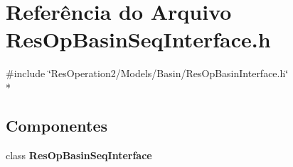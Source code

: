 \section{Referência do Arquivo Res\+Op\+Basin\+Seq\+Interface.\+h}
\label{_res_op_basin_seq_interface_8h}
{\ttfamily \#include \char`\"{}Res\+Operation2/\+Models/\+Basin/\+Res\+Op\+Basin\+Interface.\+h\char`\"{}}\\*
\subsection*{Componentes}
\begin{DoxyCompactItemize}
\item 
class {\bf Res\+Op\+Basin\+Seq\+Interface}
\end{DoxyCompactItemize}
